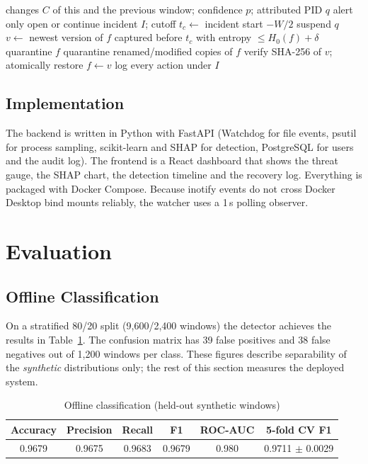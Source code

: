 \documentclass[conference]{IEEEtran}
\begin{document}
\begin{algorithm}[t]
\caption{Automated response to a flagged window}
\label{alg:response}
\small
\begin{algorithmic}[1]
\Require changes $C$ of this and the previous window; confidence $p$; attributed PID $q$
 \Return alert only \EndIf
\State open or continue incident $I$; cutoff $t_c \gets$ incident start $- W/2$
 \State suspend $q$ \EndIf
{}
  \State $v \gets$ newest version of $f$ captured before $t_c$ with entropy $\le H_0(f)+\delta$
   quarantine $f$ 
    \State quarantine renamed/modified copies of $f$
    \State verify SHA-256 of $v$; atomically restore $f \gets v$
  \EndIf
\EndFor
\State log every action under $I$
\end{algorithmic}
\end{algorithm}

\subsection{Implementation}
The backend is written in Python with FastAPI (Watchdog for file events, psutil for process sampling, scikit-learn and SHAP for detection, PostgreSQL for users and the audit log). The frontend is a React dashboard that shows the threat gauge, the SHAP chart, the detection timeline and the recovery log. Everything is packaged with Docker Compose. Because inotify events do not cross Docker Desktop bind mounts reliably, the watcher uses a 1\,s polling observer.

\section{Evaluation}\label{sec:eval}
\subsection{Offline Classification}
On a stratified 80/20 split (9{,}600/2{,}400 windows) the detector achieves the results in Table~\ref{tab:offline}. The confusion matrix has 39 false positives and 38 false negatives out of 1{,}200 windows per class. These figures describe separability of the \emph{synthetic} distributions only; the rest of this section measures the deployed system.

\begin{table}[t]
\caption{Offline classification (held-out synthetic windows)}
\label{tab:offline}
\centering
\footnotesize
\begin{tabular}{@{}cccccc@{}}
\toprule
Accuracy & Precision & Recall & F1 & ROC-AUC & 5-fold CV F1 \\
\midrule
0.9679 & 0.9675 & 0.9683 & 0.9679 & 0.980 & 0.9711 $\pm$ 0.0029 \\
\bottomrule
\end{tabular}
\end{table}
\end{document}
